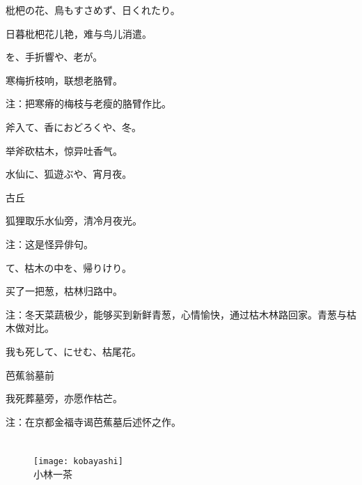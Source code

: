 \begin{haiku}
    {\FH 枇杷の花、鳥もすさめず、日くれたり。}

    {\FK 日暮枇杷花儿艳，难与鸟儿消遣。}
\end{haiku}

\begin{haiku}
    {\FH {}を、手折響や、老が。}

    {\FK 寒梅折枝响，联想老胳臂。}

    {\FT 注：把寒瘠的梅枝与老瘦的胳臂作比。}
\end{haiku}

\begin{haiku}
    {\FH 斧入て、香におどろくや、冬。}

    {\FK 举斧砍枯木，惊异吐香气。}
\end{haiku}

\begin{haiku}
    {\FH 水仙に、狐遊ぶや、宵月夜。}

    {\FK 古丘}

    {\FK 狐狸取乐水仙旁，清冷月夜光。}

    {\FT 注：这是怪异俳句。}
\end{haiku}

\begin{haiku}
    {\FH {}て、枯木の中を、帰りけり。}

    {\FK 买了一把葱，枯林归路中。}

    {\FT 注：冬天菜蔬极少，能够买到新鲜青葱，心情愉快，通过枯木林路回家。青葱与枯木做对比。}
\end{haiku}

\begin{haiku}
    {\FH 我も死して、にせむ、枯尾花。}

    {\FK 芭蕉翁墓前}

    {\FK 我死葬墓旁，亦愿作枯芒。}

    {\FT 注：在京都金福寺谒芭蕉墓后述怀之作。}
\end{haiku}

\chapter[{\FM 小林一茶}]{\FM {}}

\begin{center}
    \begin{figure}
        \centering
        \texttt{[image: kobayashi]}\\[1em]
        \large{\FS 小林一茶}
    \end{figure}
\end{center}

